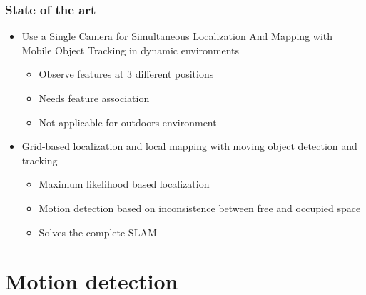 \documentclass{beamer}
\begin{document}
	\begin{frame}
		\frametitle{State of the art}
		
			\begin{itemize}
			\item Use a Single Camera for Simultaneous Localization And Mapping with  Mobile Object Tracking in dynamic environments \cite{Migliore_2009_ICRA}
				\begin{itemize}			
				\item Observe features at 3 different positions
				\item Needs feature association
				\item Not applicable for outdoors environment 
				\end{itemize}		
			\item Grid-based localization and local mapping with moving object detection and tracking \cite{Vu201158}
				\begin{itemize}		
				\item Maximum likelihood based localization	
				\item Motion detection based on inconsistence between free and occupied space
				\item Solves the complete SLAM
				\end{itemize}	
			\end{itemize}		
	\end{frame}


\section{Motion detection}
\end{document}
